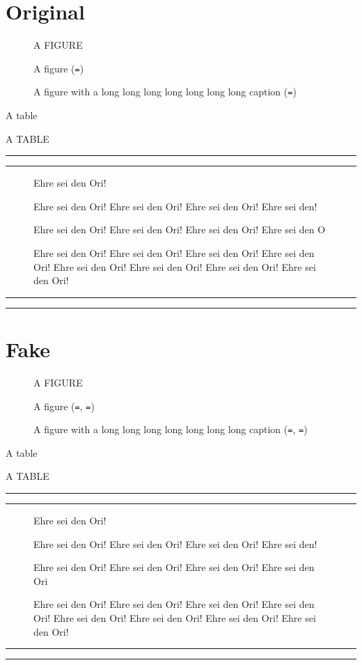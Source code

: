 \documentclass{smfart}
\begin{document}
\section{Original}
\OriginalCaptions
\setcounter{figure}{0}
\setcounter{table}{0}

\begin{figure}[!ht]
\centering A FIGURE
\caption{A figure (\texttt{\string\captionindent=\the\captionindent})}
\caption{A figure with a long long long long long long long caption
         (\texttt{\string\captionindent=\the\captionindent})}
\end{figure}

\begin{table}[!ht]
\caption{A table}
\centering A TABLE
\end{table}

\hrule
\noindent\rule{\captionindent}{1pt}%

\begin{figure}[!ht]
\centering Ehre sei den Ori!
\caption{Ehre sei den Ori! Ehre sei den Ori! Ehre sei den Ori! Ehre sei den!}
\caption{Ehre sei den Ori! Ehre sei den Ori! Ehre sei den Ori! Ehre sei den O}
\caption{Ehre sei den Ori! Ehre sei den Ori! Ehre sei den Ori! Ehre sei den Ori!
         Ehre sei den Ori! Ehre sei den Ori! Ehre sei den Ori! Ehre sei den Ori!}
\end{figure}

\noindent\rule{\captionindent}{1pt}%
\hrule

\clearpage
\section{Fake}
\FakeCaptions
\setcounter{figure}{0}
\setcounter{table}{0}

\makeatletter
\let\captionmarginx\captionmargin@
\makeatother

\begin{figure}[!ht]
\centering A FIGURE
\caption{A figure
         (\texttt{\string\captionmargin=\the\captionmargin},
          \texttt{\string\captionmargin@=\the\captionmarginx})}
\caption{A figure with a long long long long long long long caption
         (\texttt{\string\captionmargin=\the\captionmargin},
          \texttt{\string\captionmargin@=\the\captionmarginx})}
\end{figure}

\begin{table}[!ht]
\caption{A table}
\centering A TABLE
\end{table}

\hrule
\noindent\rule{\captionindent}{1pt}%

\begin{figure}[!ht]
\centering Ehre sei den Ori!
\caption{Ehre sei den Ori! Ehre sei den Ori! Ehre sei den Ori! Ehre sei den!}
\caption{Ehre sei den Ori! Ehre sei den Ori! Ehre sei den Ori! Ehre sei den Ori}
\caption{Ehre sei den Ori! Ehre sei den Ori! Ehre sei den Ori! Ehre sei den Ori!
         Ehre sei den Ori! Ehre sei den Ori! Ehre sei den Ori! Ehre sei den Ori!}
\end{figure}

\noindent\rule{\captionindent}{1pt}%
\hrule

\vfill
\end{document}
